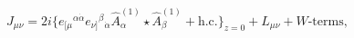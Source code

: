 \begin{equation}
J_{\mu\nu} =  2i\big\{
e_{[\mu}{}^{\alpha\dot\alpha} e_{\nu]}{}^\beta{}_{\dot\alpha} 
\widehat A^{(1)}_\alpha
\star \widehat A^{(1)}_\beta +  \mbox{h.c.} \big\}_{z=0}
+ L_{\mu\nu}  +\mbox{$W$-terms}, \label{eq:Jdef}
\end{equation}

